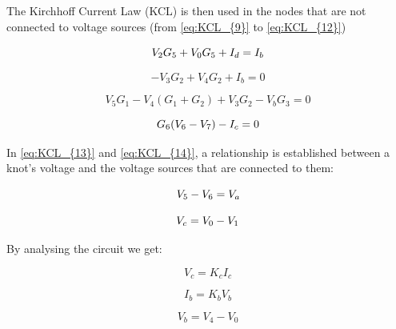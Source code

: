 The Kirchhoff Current Law (KCL) is then used in the nodes that are not connected
to voltage sources (from \ref{eq:KCL_{9}} to \ref{eq:KCL_{12}})
\vspace{0.1cm}

\begin{equation}
    V_{2} G_{5} + V_{0} G_{5} + I_{d} = I_{b}
    \label{eq:KCL_{9}}
\end{equation}


\begin{equation}
    -V_{3} G_{2} + V_{4} G_{2} + I_{b} = 0
\end{equation}


\begin{equation}
    V_{5} G_{1} - V_{4} (G_{1} + G_{2}) + V_{3} G_{2} - V_{b} G_{3} = 0
\end{equation}

\begin{equation}
    G_{6} (V_{6} - V_{7}) - I_{c} = 0
    \label{eq:KCL_{12}}
\end{equation}
\vspace{0.5cm}

\pagebreak

In \ref{eq:KCL_{13}} and \ref{eq:KCL_{14}}, a relationship is established between
a knot's voltage and the voltage sources that are connected to them:

\begin{equation}
    V_{5} - V_{6} = V_{a}
    \label{eq:KCL_{13}}
\end{equation}

\begin{equation}
    V_{c} = V_{0} - V_{1}
    \label{eq:KCL_{14}}
\end{equation}



\vspace{0.5cm}

By analysing the circuit we get:

\vspace{0.5cm}
\begin{equation}
    V_{c} = K_{c} I_{c}
\end{equation}

\begin{equation}
    I_{b} = K_{b} V_{b}
\end{equation}

\begin{equation}
    V_{b} = V_{4} - V_{0}
\end{equation}

